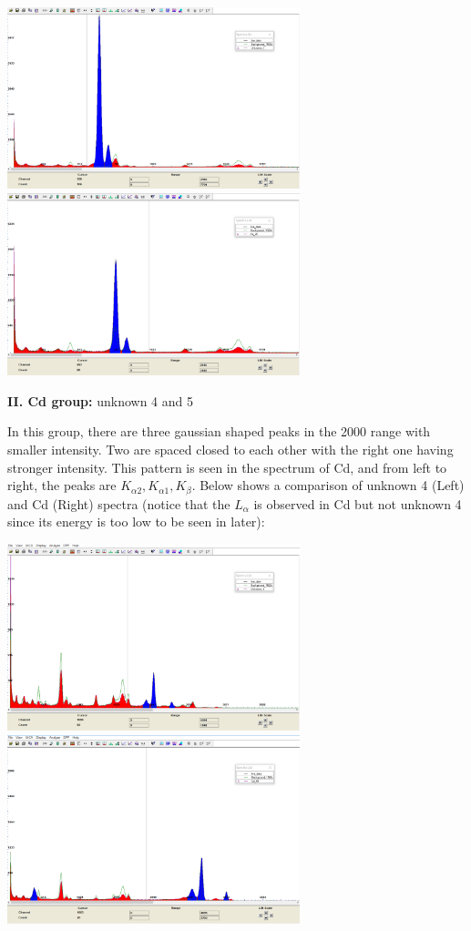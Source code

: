 \documentclass[12pt]{article}
\begin{document}
\includegraphics[width=8.5cm]{U1}
\includegraphics[width=8.5cm]{Fe_26}
\smallskip

\textbf{II. Cd group:} unknown 4 and 5

In this group, there are three gaussian shaped peaks in the 2000 range with smaller intensity. Two are spaced closed to each other with the right one having stronger intensity. This pattern is seen in the spectrum of Cd, and from left to right, the peaks are $K_{\alpha2}, K_{\alpha1}, K_{\beta}$. Below shows a comparison of unknown 4 (Left) and Cd (Right) spectra (notice that the $L_{\alpha}$ is observed in Cd but not unknown 4 since its energy is too low to be seen in later):

\includegraphics[width=8.5cm]{U4}
\includegraphics[width=8.5cm]{Cd_48}
\smallskip
\end{document}
